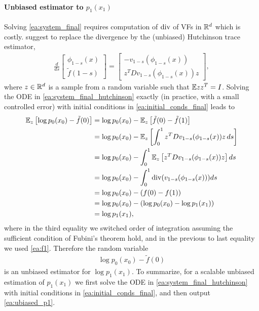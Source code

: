 \documentclass{article}
\begin{document}
\paragraph{Unbiased estimator to $p_1(x_1)$}
Solving \eqref{ea:system_final} requires computation of $\mathrm{div}$ of VFs in $\mathbb R^d$ which is costly. \cite{ffjord2018} suggest to replace the divergence by the (unbiased) Hutchinson trace estimator, 
\begin{align}\label{ea:system_final_hutchinson}
    \frac{d}{ds}\begin{bmatrix}
    \phi_{1-s}(x) \\
    \tilde{f}(1-s)
    \end{bmatrix}=
    \begin{bmatrix}
    -v_{1-s}(\phi_{1-s}(x)) \\ 
    z^T Dv_{1-s}(\phi_{1-s}(x)) z
    \end{bmatrix},
\end{align}
where $z\in \mathbb R^d$ is a sample from a random variable such that $\mathbb{E} zz^T=I$. Solving the ODE in \eqref{ea:system_final_hutchinson} exactly (in practice, with a  small controlled error) with initial conditions in \eqref{ea:initial_conds_final} leads to
\begin{align*}
    \mathbb{E}_z \left [\log p_0(x_0) - \tilde{f}(0)\right ] &= \log p_0(x_0) - \mathbb{E}_z \left [\tilde{f}(0)-\tilde{f}(1)\right ] \\
    &= \log p_0(x_0) - \mathbb{E}_z\left [\int_0^1 z^T Dv_{1-s}(\phi_{1-s}(x)) z \, ds\right ]  \\
    &= \log p_0(x_0) - \int_0^1 \mathbb{E}_z \left [z^T Dv_{1-s}(\phi_{1-s}(x)) z \right ] ds  \\
    &= \log p_0(x_0) - \int_0^1 \mathrm{div}(v_{1-s}(\phi_{1-s}(x))) ds 
    \\
    &= \log p_0(x_0) - \left (f(0)-f(1)\right ) \\
    &= \log p_0(x_0) - \left (\log p_0(x_0) - \log p_1(x_1)\right ) \\
    &= \log p_1(x_1),
\end{align*} 
where in the third equality we switched order of integration assuming the sufficient condition of Fubini's theorem hold, and in the previous to last equality we used \eqref{ea:f1}. 
Therefore the random variable 
\begin{align}\label{ea:ubiased_p1}
    \log p_0(x_0) - \tilde{f}(0)
\end{align}
is an unbiased estimator for $\log p_1(x_1)$. To summarize, for a scalable unbiased estimation of $p_1(x_1)$ we first solve the ODE in \eqref{ea:system_final_hutchinson} with initial conditions in \eqref{ea:initial_conds_final}, and then output  \eqref{ea:ubiased_p1}. 
\end{document}
